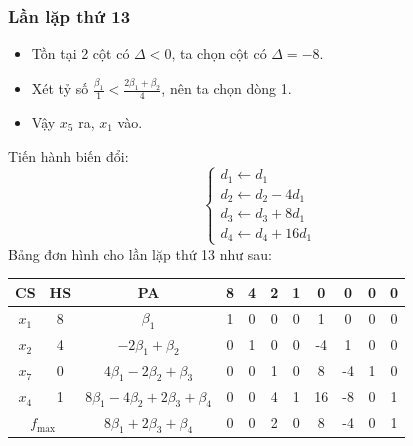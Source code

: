 \documentclass[12pt]{article}
\begin{document}
\subsubsection{Lần lặp thứ 13}
\begin{itemize}
\item Tồn tại 2 cột có $\Delta < 0$, ta chọn cột có $\Delta = -8$.
\item Xét tỷ số $\displaystyle \frac{\beta_1}{1} < \frac{2\beta_1 + \beta_2}{4}$, nên ta chọn dòng 1.
\item Vậy $x_5$ ra, $x_1$ vào.
\end{itemize}
Tiến hành biến đổi:
$$
\left\{
\begin{array}{lll}
d_1 \leftarrow d_1 \\
d_2 \leftarrow d_2 - 4d_1\\
d_3 \leftarrow d_3 + 8d_1\\
d_4 \leftarrow d_4 + 16d_1
\end{array}
\right.
$$
Bảng đơn hình cho lần lặp thứ 13 như sau:
\begin{table}[H]
\centering
\begin{tabular}{|c|c|c|c|c|c|c|c|c|c|c|}
\hline
CS & HS & PA & 8 & 4 & 2 & 1 & 0 & 0 & 0 & 0 \\
\hline
$x_1$ & 8 & $\beta_1$ & 1 & 0 & 0 & 0 & 1 & 0 & 0 & 0 \\
$x_2$ & 4 & $-2\beta_1 + \beta_2$ & 0 & 1 & 0 & 0 & -4 & 1 & 0 & 0 \\
$x_7$ & 0 & $4\beta_1 - 2\beta_2 + \beta_3$ & 0 & 0 & 1 & 0 & 8 & -4 & 1 & 0 \\
$x_4$ & 1 & $8\beta_1 - 4\beta_2 + 2\beta_3 + \beta_4$ & 0 & 0 & 4 & 1 & 16 & -8 & 0 & 1 \\
\hline
\multicolumn{2}{|c|}{$f_{\max}$}
& $8\beta_1 + 2\beta_3 + \beta_4$ & 0 & 0 & 2 & 0 & 8 & -4 & 0 & 1 \\
\hline
\end{tabular}
\end{table}
\end{document}
